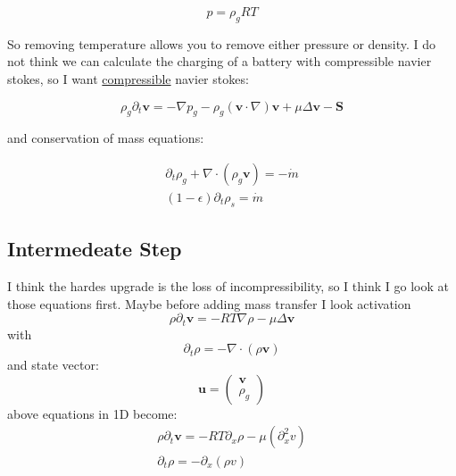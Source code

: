 \documentclass{article}
\begin{document}
\begin{equation}
    p = \rho_g RT
\end{equation}

So removing temperature allows you to remove either pressure or density. I do not think we can calculate the charging of a battery with compressible navier stokes, so I want \underline{compressible} navier stokes:

\begin{equation}
    {\rho_g \partial_t \mathbf{v}}
    ={-\nabla p_g}
    -{\rho_g (\mathbf{v}\cdot \nabla)\mathbf{v}}
    +{\mu \Delta \mathbf{v}}
    -{\mathbf{S}}
\end{equation}

and conservation of mass equations:

\begin{equation}
    \begin{aligned}
        {\partial_t \rho_g}+\nabla \cdot (\rho_g \mathbf{v}) = -\dot m \\
        (1-\epsilon)\partial_t \rho_s = \dot{m}
    \end{aligned}
\end{equation}


\subsection*{Intermedeate Step}
I think the hardes upgrade is the loss of incompressibility, so I think I go look at those equations first. Maybe before adding mass transfer I look activation
\begin{equation}
    {\rho \partial_t \mathbf{v}}
    ={-RT\nabla \rho}
    -\mu \Delta \mathbf{v}
\end{equation}
with
\begin{equation}
        {\partial_t \rho} = -\nabla \cdot (\rho \mathbf{v})
\end{equation}
and state vector:
\begin{equation}
    \mathbf{u} = \begin{pmatrix}
        \mathbf{v} \\ \rho_g
    \end{pmatrix}
\end{equation}
above equations in 1D become:
\begin{equation}
    \begin{aligned}
        \rho \partial_t \mathbf{v}=-RT\partial_x \rho-\mu(\partial_x^2 v) \\
        \partial_t \rho = -\partial_x (\rho v)
    \end{aligned}
\end{equation}
\end{document}
